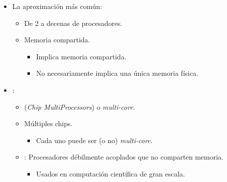 \begin{frame}[t]
\begin{itemize}
  \item La aproximación más común:
    \begin{itemize}
      \item De 2 a decenas de procesadores.
      \item Memoria compartida.
        \begin{itemize}
          \item Implica memoria compartida.
          \item No necesariamente implica una única memoria física.
        \end{itemize}
    \end{itemize}

  \item {}:
    \begin{itemize}
      \item {} (\emph{Chip MultiProcessors}) o \emph{multi-core}.
      \item Múltiples chips.
        \begin{itemize}
          \item Cada uno puede ser (o no) \emph{multi-core}.
        \end{itemize}
      \item {}: Procesadores débilmente acoplados que no comparten memoria.
        \begin{itemize}
          \item Usados en computación científica de gran escala.
        \end{itemize}
    \end{itemize}
\end{itemize}
\end{frame}

